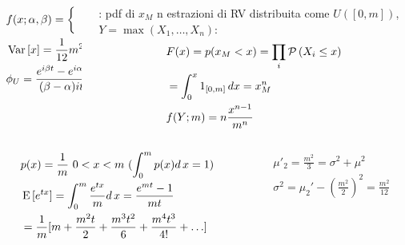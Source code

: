 \documentclass[asd-beamer.tex]{subfiles}%
\begin{document}
\begin{frame}{}
\begin{columns}[T]
	\begin{column}{0.5\textwidth}
	\begin{align*}
	&f(x;\alpha,\beta)=\left\{\begin{array}{c}\frac{1}{\beta-\alpha}\\0\\
	\end{array}\right.\\
	&\operatorname{Var}{[x]}=\frac{1}{12}m^2\\
	&\phi_U=\frac{e^{i\beta t}-e^{i\alpha t}}{(\beta-\alpha)it}
	\end{align*}
	\end{column}
	\begin{column}{0.5\textwidth}
	\begin{block}{: pdf di $x_M$}
		n estrazioni di RV distribuita come $U([0,m])$, $Y=\max{(X_1,\ldots,X_n)}$:
		\begin{align*}
		&F(x)=p(x_M<x)=\prod_i\operatorname{\mathcal{P}}{(X_i\leq x)}\\
		&=\int_0^x1_{[0,m]}\,dx=x_M^n\\
		&f(Y;m)=n\frac{x^{n-1}}{m^n}
		\end{align*}
	\end{block}
\end{column}
\end{columns}
\begin{columns}[T]
\begin{column}{0.5\textwidth}
\begin{align*}
&p(x)=\frac{1}{m}\ 0<x<m\ (\int_0^mp(x)d\,x=1)\\
&\operatorname{E}{[e^{tx}]}=\int_0^m\frac{e^{tx}}{m}d\,x=\frac{e^{mt}-1}{mt}\\
&=\frac{1}{m}[m+\frac{m^2t}{2}+\frac{m^3t^2}{6}+\frac{m^4t^3}{4!}+\ldots]
\end{align*}
\end{column}
\begin{column}{0.5\textwidth}
\begin{align*}
&\mu'_2=\frac{m^2}{3}=\sigma^2+\mu^2\\
&\sigma^2=\mu_2'-(\frac{m^2}{2})^2=\frac{m^2}{12}
\end{align*}
\end{column}
\end{columns}
\end{frame}
\end{document}
